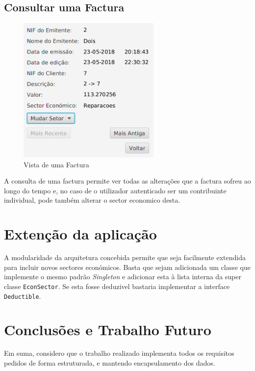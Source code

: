 \documentclass[12pt,a4paper]{report}
\begin{document}
    \section{Consultar uma Factura}
    \label{sec:viewFactura}
\begin{figure}
    \centering
    \includegraphics[width=7cm]{./images/facturaView.png}
    \caption{Vista de uma Factura}
    \label{fig:viewFactura}
\end{figure}
    A consulta de uma factura permite ver todas as alterações que a factura
    sofreu ao longo do tempo e, no caso de o utilizador autenticado ser
    um contribuinte individual, pode também alterar o sector economico desta.

\chapter{Extenção da aplicação}
    A modularidade da arquitetura concebida permite que seja facilmente
    extendida para incluir novos sectores económicos. Basta que sejam
    adicionada um classe que implemente o mesmo padrão \textit{Singleton}
    e adicionar esta à lista interna da super classe
    \texttt{EconSector}. Se esta fosse deduzivel bastaria implementar
    a interface \texttt{Deductible}.

\chapter{Conclusões e Trabalho Futuro}
    Em suma, considero que o trabalho realizado implementa todos os requisitos
    pedidos de forma estruturada, e mantendo encapsulamento dos dados.
\end{document}
